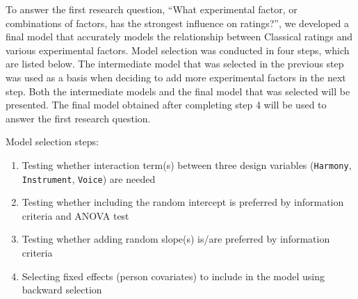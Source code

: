\documentclass{article}
\begin{document}
To answer the first research question, ``What experimental factor, or combinations of factors, has the strongest influence on ratings?'', we developed a final model that accurately models the relationship between Classical ratings and various experimental factors. Model selection was conducted in four steps, which are listed below. The intermediate model that was selected in the previous step was used as a basis when deciding to add more experimental factors in the next step. Both the intermediate models and the final model that was selected will be presented. The final model obtained after completing step 4 will be used to answer the first research question.
\bigbreak

Model selection steps:
\begin{enumerate}
    \item Testing whether interaction term(s) between three design variables (\texttt{Harmony}, \texttt{Instrument}, \texttt{Voice}) are needed
    \item Testing whether including the random intercept is preferred by information criteria and ANOVA test
    \item Testing whether adding random slope(s) is/are preferred by information criteria
    \item Selecting fixed effects (person covariates) to include in the model using backward selection
\end{enumerate}
\end{document}
